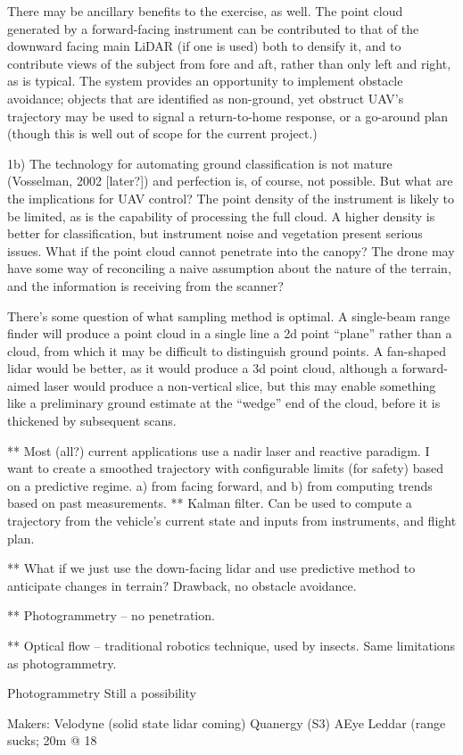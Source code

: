 \documentclass[10pt,a4paper]{report}
\begin{document}
There may be ancillary benefits to the exercise, as well. The point cloud generated by a forward-facing instrument can be contributed to that of the downward facing main LiDAR (if one is used) both to densify it, and to contribute views of the subject from fore and aft, rather than only left and right, as is typical. The system provides an opportunity to implement obstacle avoidance;  objects that are identified as non-ground, yet obstruct UAV’s trajectory may be used to signal a return-to-home response, or a go-around plan (though this is well out of scope for the current project.)

1b) The technology for automating ground classification is not mature (Vosselman, 2002 [later?]) and perfection is, of course, not possible. But what are the implications for UAV control? The point density of the instrument is likely to be limited, as is the capability of processing the full cloud. A higher density is better for classification, but instrument noise and vegetation present serious issues. What if the point cloud cannot penetrate into the canopy? The drone may have some way of reconciling a naive assumption about the nature of the terrain, and the information is receiving from the scanner?

There’s some question of what sampling method is optimal. A single-beam range finder will produce a point cloud in a single line a 2d point “plane” rather than a cloud, from which it may be difficult to distinguish ground points. A fan-shaped lidar would be better, as it would produce a 3d point cloud, although a forward-aimed laser would produce a non-vertical slice, but this may enable something like a preliminary ground estimate at the “wedge” end of the cloud, before it is thickened by subsequent scans.

** Most (all?) current applications use a nadir laser and reactive paradigm. I want to create a smoothed trajectory with configurable limits (for safety) based on a predictive regime. a) from facing forward, and b) from computing trends based on past measurements.
** Kalman filter. Can be used to compute a trajectory from the vehicle’s current state and inputs from instruments, and flight plan. 

** What if we just use the down-facing lidar and use predictive method to anticipate changes in terrain? Drawback, no obstacle avoidance.

** Photogrammetry -- no penetration.

** Optical flow -- traditional robotics technique, used by insects. Same limitations as photogrammetry.

Photogrammetry
Still a possibility

Makers:
Velodyne (solid state lidar coming)
Quanergy (S3)
AEye
Leddar (range sucks; 20m @ 18%



\end{document}

